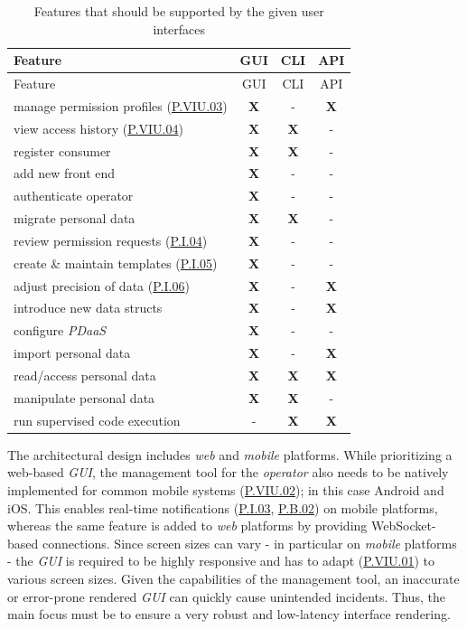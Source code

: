 \documentclass[12pt,english,a4paper,titlepage,cleardoublepage=empty,dottedtoc]{report}
\begin{document}
\begin{longtable}[]{@{}lccc@{}}
\caption{Features that should be supported by the given user interfaces
\label{tbl:ui-features}}\tabularnewline
\toprule
Feature & GUI & CLI & API\tabularnewline
\midrule
\endfirsthead
\toprule
Feature & GUI & CLI & API\tabularnewline
\midrule
\endhead
manage permission profiles (\protect\hyperlink{pviu03}{P.VIU.03}) &
\textbf{X} & - & \textbf{X}\tabularnewline
view access history (\protect\hyperlink{pviu04}{P.VIU.04}) & \textbf{X}
& \textbf{X} & -\tabularnewline
register consumer & \textbf{X} & \textbf{X} & -\tabularnewline
add new front end & \textbf{X} & - & -\tabularnewline
authenticate operator & \textbf{X} & - & -\tabularnewline
migrate personal data & \textbf{X} & \textbf{X} & -\tabularnewline
review permission requests (\protect\hyperlink{pi04}{P.I.04}) &
\textbf{X} & - & -\tabularnewline
create \& maintain templates (\protect\hyperlink{pi05}{P.I.05}) &
\textbf{X} & - & -\tabularnewline
adjust precision of data (\protect\hyperlink{pi06}{P.I.06}) & \textbf{X}
& - & \textbf{X}\tabularnewline
introduce new data structs & \textbf{X} & - & \textbf{X}\tabularnewline
configure \emph{PDaaS} & \textbf{X} & - & -\tabularnewline
import personal data & \textbf{X} & - & \textbf{X}\tabularnewline
read/access personal data & \textbf{X} & \textbf{X} &
\textbf{X}\tabularnewline
manipulate personal data & \textbf{X} & \textbf{X} & -\tabularnewline
run supervised code execution & - & \textbf{X} &
\textbf{X}\tabularnewline
\bottomrule
\end{longtable}

The architectural design includes \emph{web} and \emph{mobile}
platforms. While prioritizing a web-based \emph{GUI}, the management
tool for the \emph{operator} also needs to be natively implemented for
common mobile systems (\protect\hyperlink{pviu02}{P.VIU.02}); in this
case Android and iOS. This enables real-time notifications
(\protect\hyperlink{pi03}{P.I.03}, \protect\hyperlink{pb02}{P.B.02}) on
mobile platforms, whereas the same feature is added to \emph{web}
platforms by providing WebSocket-based connections. Since screen sizes
can vary - in particular on \emph{mobile} platforms - the \emph{GUI} is
required to be highly responsive and has to adapt
(\protect\hyperlink{pviu01}{P.VIU.01}) to various screen sizes. Given
the capabilities of the management tool, an inaccurate or error-prone
rendered \emph{GUI} can quickly cause unintended incidents. Thus, the
main focus must be to ensure a very robust and low-latency interface
rendering.
\end{document}
